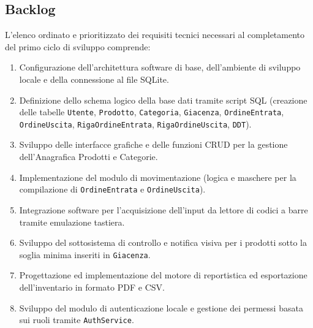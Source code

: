 \documentclass[a4paper,12pt]{article}
\begin{document}
\subsection{Backlog}
L'elenco ordinato e prioritizzato dei requisiti tecnici necessari al completamento del primo ciclo di sviluppo comprende:
\begin{enumerate}
	\item Configurazione dell'architettura software di base, dell'ambiente di sviluppo locale e della connessione al file SQLite.
	\item Definizione dello schema logico della base dati tramite script SQL (creazione delle tabelle \texttt{Utente}, \texttt{Prodotto}, \texttt{Categoria}, \texttt{Giacenza}, \texttt{OrdineEntrata}, \texttt{OrdineUscita}, \texttt{RigaOrdineEntrata}, \texttt{RigaOrdineUscita}, \texttt{DDT}).
	\item Sviluppo delle interfacce grafiche e delle funzioni CRUD per la gestione dell'Anagrafica Prodotti e Categorie.
	\item Implementazione del modulo di movimentazione (logica e maschere per la compilazione di \texttt{OrdineEntrata} e \texttt{OrdineUscita}).
	\item Integrazione software per l'acquisizione dell'input da lettore di codici a barre tramite emulazione tastiera.
	\item Sviluppo del sottosistema di controllo e notifica visiva per i prodotti sotto la soglia minima inseriti in \texttt{Giacenza}.
	\item Progettazione ed implementazione del motore di reportistica ed esportazione dell'inventario in formato PDF e CSV.
	\item Sviluppo del modulo di autenticazione locale e gestione dei permessi basata sui ruoli tramite \texttt{AuthService}.
\end{enumerate}
\end{document}
